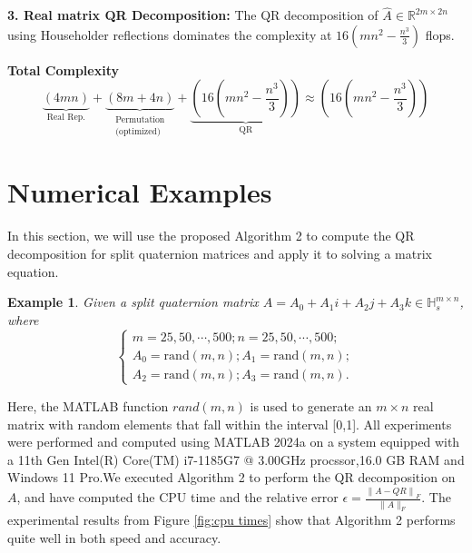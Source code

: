 \documentclass[1p]{elsarticle}
\newtheorem{example}[theorem]{Example}
\numberwithin{equation}{section}
\begin{document}
\textbf{3. Real matrix QR Decomposition:}
The QR decomposition of $\widehat{A} \in \mathbb{R}^{2m \times 2n}$ using Householder reflections dominates the complexity at $16(mn^2-\frac{n^3}{3})$ flops.

\textbf{Total Complexity}
$$
\underbrace{(4mn)}_{\text{Real Rep.}} + \underbrace{(8m+4n)}_{\substack{\text{Permutation} \\ \text{(optimized)}}} + \underbrace{(16(mn^2-\frac{n^3}{3}))}_{\text{QR}} \approx \boxed{(16(mn^2-\frac{n^3}{3}))}
$$  


\section{Numerical Examples}
In this section,  we will use the proposed  Algorithm 2 to compute the QR decomposition for split quaternion matrices and apply it to solving a matrix equation.
\begin{example}
    Given a split quaternion matrix $A = A_{0}+A_{1}i+A_{2}j+A_{3}k\in \mathbb{H}_s^{m\times n}$, where
    \begin{equation}
       \begin{cases}
            m = 25,50,\cdots,500;
            n = 25,50,\cdots,500;  \\
            A_{0}=\text{rand}(m,n);
            A_{1}=\text{rand}(m,n); \\
            A_{2}=\text{rand}(m,n);
            A_{3}=\text{rand}(m,n).
        \end{cases} \label{eq:example2}
    \end{equation}
\end{example}
Here, the MATLAB function  $rand(m,n)$ is used to generate an $m \times n$ real matrix with random elements that fall within the interval [0,1]. All experiments were performed and computed using MATLAB 2024a on a system equipped with a 11th Gen Intel(R) Core(TM) i7-1185G7 @ 3.00GHz procssor,16.0 GB RAM and Windows 11 Pro.We executed Algorithm 2 to perform the QR decomposition on $A$, and have computed the CPU time and the relative error
$\epsilon = \frac{\left\|A - Q R\right\|_{F}}{\|A\|_{F}}.$
The experimental results from Figure \ref{fig:cpu times} show that Algorithm 2 performs quite well in both speed and accuracy. 
\end{document}
